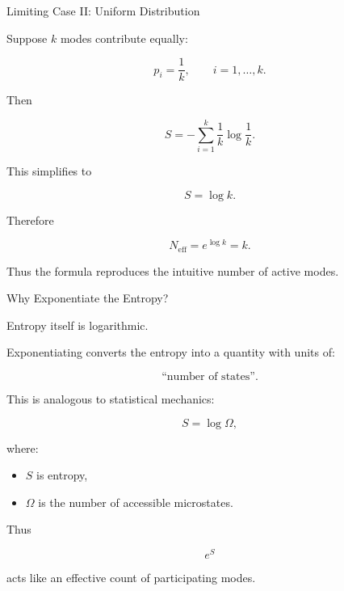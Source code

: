 \documentclass{beamer}
\begin{document}
\begin{frame}{Limiting Case II: Uniform Distribution}

Suppose $k$ modes contribute equally:

\[
p_i=\frac1k,
\qquad
i=1,\dots,k.
\]

Then

\[
S
=
-\sum_{i=1}^k
\frac1k
\log\frac1k.
\]

This simplifies to

\[
S=\log k.
\]

Therefore

\[
N_{\mathrm{eff}}
=
e^{\log k}
=
k.
\]

\vspace{0.4cm}

Thus the formula reproduces the intuitive number of active modes.

\end{frame}

\begin{frame}{Why Exponentiate the Entropy?}

Entropy itself is logarithmic.

\vspace{0.3cm}

Exponentiating converts the entropy into a quantity with units of:

\[
\text{``number of states''}.
\]

\vspace{0.4cm}

This is analogous to statistical mechanics:

\[
S = \log \Omega,
\]

where:

\begin{itemize}
    \item $S$ is entropy,
    \item $\Omega$ is the number of accessible microstates.
\end{itemize}

\vspace{0.4cm}

Thus

\[
e^S
\]

acts like an effective count of participating modes.

\end{frame}
\end{document}
